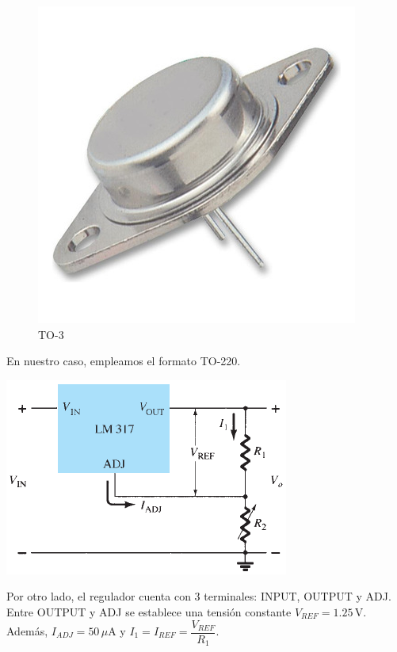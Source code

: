 \documentclass[chaptersright]{informeutn}
\begin{document}
\begin{figure}[H]
\begin{minipage}[b]{0.3\textwidth}
                \includegraphics[width=\textwidth]{pictures/to3.jpg}
                \caption*{TO-3}
            \end{minipage}
          \end{figure}
          En nuestro caso, empleamos el formato TO-220.
          \begin{center}
            \begin{minipage}{0.45\textwidth}
              \centering
              \includegraphics[width=\linewidth]{pictures/Salida_lm317.png}
            \end{minipage}
            \hfill
            \begin{minipage}{0.5\textwidth}
              Por otro lado, el regulador cuenta con 3 terminales: INPUT, OUTPUT y ADJ. Entre OUTPUT y ADJ se establece
              una tensión constante $V_{REF} = 1.25\,\mathrm{V}$. Además, $I_{ADJ} = 50\,\mu\mathrm{A}$ \quad y \quad
              $I_1 = I_{REF} = \dfrac{V_{REF}}{R_1}$.
            \end{minipage}
            \vspace{5mm}
          \end{center}
\end{document}

